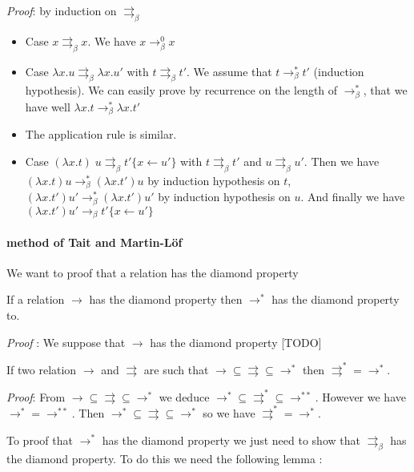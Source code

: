   \textit{Proof}: by induction on $\rightrightarrows_\beta$

  \begin{itemize}
    \item Case $x \rightrightarrows_\beta x$. We have $x\to^0_\beta x$

    \item Case $\lambda x. u \rightrightarrows_\beta \lambda x. u'$ with $t
      \rightrightarrows_\beta t'$. We assume that $t \to_\beta^* t'$ (induction
      hypothesis). We can easily prove by recurrence on the length of
      $\to_\beta^*$, that we have well $\lambda x. t \to_\beta^* \lambda x.t'$

    \item The application rule is similar.

    \item Case $(\lambda x. t)\; u \rightrightarrows_\beta t'\{x \leftarrow
      u'\}$ with $t \rightrightarrows_\beta t'$ and $u \rightrightarrows_\beta
      u'$. Then we have $(\lambda x. t) u \to_\beta^* (\lambda x. t') u$ by
      induction hypothesis on $t$, $(\lambda x. t') u' \to_\beta^* (\lambda x.
      t') u'$ by induction hypothesis on $u$. And finally we have $(\lambda x.
      t') u' \to_\beta t'\{x\leftarrow u'\}$
  \end{itemize}
  \qedsymbol

  \paragraph{method of Tait and Martin-Löf} We want to proof that a relation has
  the diamond property

  \lemma If a relation $\to$ has the diamond property then $\to^*$ has the
  diamond property to.

  \textit{Proof} : We suppose that $\to$ has the diamond property [TODO]
  \qedsymbol

  \lemma If two relation  $\to$ and $\rightrightarrows$ are such that $\to
  \subseteq \rightrightarrows \subseteq \to^*$ then $\rightrightarrows^* =
  \to^*$.

  \textit{Proof}: From $\to \subseteq \rightrightarrows \subseteq \to^*$ we
  deduce $\to^* \subseteq \rightrightarrows^* \subseteq \to^{**}$. However we
  have $\to^* = \to^{**}$. Then $\to^* \subseteq \rightrightarrows
  \subseteq \to^*$ so we have $\rightrightarrows^* = \to^*$.\\
  \qedsymbol

  To proof that $\to^*$ has the diamond property we just need to show that
  $\rightrightarrows_\beta$ has the diamond property. To do this we need the
  following lemma :

